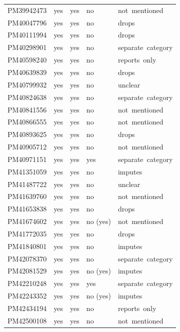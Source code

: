 \begin{longtable}{@{}p{0.9in}p{0.42in}p{0.42in}p{0.55in}p{1.7in}@{}}
PM39942473 & yes & yes & no & not\ mentioned\\
PM40047796 & yes & yes & no & drops\\
PM40111994 & yes & yes & no & drops\\
PM40298901 & yes & yes & no & separate\ category\\
PM40598240 & yes & yes & no & reports\ only\\
PM40639839 & yes & yes & no & drops\\
PM40799932 & yes & yes & no & unclear\\
PM40824638 & yes & yes & no & separate\ category\\
PM40841556 & yes & yes & no & not\ mentioned\\
PM40866555 & yes & yes & no & not\ mentioned\\
PM40893625 & yes & yes & no & drops\\
PM40905712 & yes & yes & no & not\ mentioned\\
PM40971151 & yes & yes & yes & separate\ category\\
PM41351059 & yes & yes & no & imputes\\
PM41487722 & yes & yes & no & unclear\\
PM41639760 & yes & yes & no & not\ mentioned\\
PM41653838 & yes & yes & no & drops\\
PM41674602 & yes & yes & no (yes) & not\ mentioned\\
PM41772035 & yes & yes & no & drops\\
PM41840801 & yes & yes & no & imputes\\
PM42078370 & yes & yes & no & separate\ category\\
PM42081529 & yes & yes & no (yes) & imputes\\
PM42210248 & yes & yes & yes & separate\ category\\
PM42243352 & yes & yes & no (yes) & imputes\\
PM42434194 & yes & yes & no & reports\ only\\
PM42500108 & yes & yes & no & not\ mentioned\\
\end{longtable}

\doublespacing

